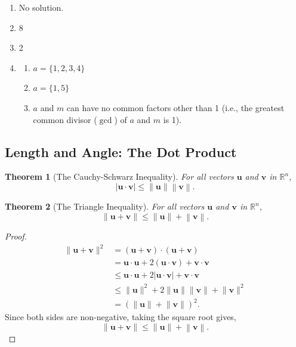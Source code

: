 \documentclass{article}
\newtheorem*{theorem*}{Theorem}
\begin{document}
\begin{enumerate}
  \item No solution.
  \item 8
  \item 2
        \setcounter{enumi}{56}
  \item \begin{enumerate}
          \item $a=\{1, 2, 3, 4\}$
          \item $a=\{1, 5\}$
          \item $a$ and $m$ can have no common factors other than 1 (i.e., the greatest common
                divisor ($\gcd$) of $a$ and $m$ is 1).
        \end{enumerate}
\end{enumerate}

\subsection{Length and Angle: The Dot Product}
\begin{theorem*}[The Cauchy-Schwarz Inequality]
  For all vectors $\mathbf{u}$ and $\mathbf{v}$ in $\mathbb{R}^n$,
  \[|\mathbf{u}\cdot\mathbf{v}|\le\left\|\mathbf{u}\right\|\left\|\mathbf{v}\right\|.\]
\end{theorem*}
\begin{theorem*}[The Triangle Inequality]
  For all vectors $\mathbf{u}$ and $\mathbf{v}$ in $\mathbb{R}^n$,
  \[\lVert\mathbf{u}+\mathbf{v}\rVert\le\left\|\mathbf{u}\right\|+\left\|\mathbf{v}\right\|.\]
\end{theorem*}
\begin{proof}
  \begin{align*}
    \lVert\mathbf{u}+\mathbf{v}\rVert^2 & = (\mathbf{u}+\mathbf{v})\cdot(\mathbf{u}+\mathbf{v}) \\
                                        & = \mathbf{u}\cdot\mathbf{u} +
    2(\mathbf{u}\cdot\mathbf{v}) + \mathbf{v}\cdot\mathbf{v}                                    \\
                                        & \le \mathbf{u}\cdot\mathbf{u} +
    2\left|\mathbf{u}\cdot\mathbf{v}\right| + \mathbf{v}\cdot\mathbf{v}                         \\
                                        & \le \lVert\mathbf{u}\rVert^2 +
    2\lVert\mathbf{u}\rVert\lVert\mathbf{v}\rVert + \lVert\mathbf{v}\rVert^2                    \\
                                        & =
    \left(\lVert\mathbf{u}\rVert+\lVert\mathbf{v}\rVert\right)^2.
  \end{align*}
  Since both sides are non-negative, taking the square root gives,
  \[\lVert\mathbf{u}+\mathbf{v}\rVert\le\left\|\mathbf{u}\right\|+\left\|\mathbf{v}\right\|.\]
\end{proof}
\end{document}
